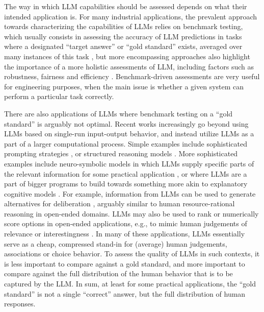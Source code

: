 \documentclass[fleqn]{article}
\begin{document}
The way in which LLM capabilities should be assessed depends on what their intended application is.
For many industrial applications, the prevalent approach towards characterizing the capabilities of LLMs relies on benchmark testing, which usually consists in assessing the accuracy of LLM predictions in tasks where a designated ``target answer'' or ``gold standard'' exists, averaged over many instances of this task \citep[e.g.,][]{srivastava2023-BIGbench}, but more encompassing approaches also highlight the importance of a more holistic assessments of LLM, including factors such as robustness, fairness and efficiency \citep{LiangBommasani2023:Holistic-Evalua}.
Benchmark-driven assessments are very useful for engineering purposes, when the main issue is whether a given system can perform a particular task correctly.




There are also applications of LLMs where benchmark testing on a ``gold standard'' is arguably not optimal.
Recent works increasingly go beyond using LLMs based on single-run input-output behavior, and instead utilize LLMs as a part of a larger computational process.
Simple examples include sophisticated prompting strategies \citep[e.g.,][]{LiuLiu2022:Generated-Knowl}, or structured reasoning models \citep[e.g.,][]{CreswellShanahan2022:Selection-Infer,GaoMadaan2023:PAL:-Program-ai,ParanjapeLundberg2023:ART:-Automatic-}.
More sophisticated examples include neuro-symbolic models in which LLMs supply specific parts of the relevant information for some practical application , or where LLMs are a part of bigger programs to build towards something more akin to explanatory cognitive models \citep[e.g.,][]{WongGrand2023:From-Word-Model}.
For example, information from LLMs can be used to generate alternatives for deliberation \citep[e.g.][]{TsvilodubCarcassi2024:Towards-Neuro-S}, arguably similar to human resource-rational reasoning in open-ended domains. 
LLMs may also be used to rank or numerically score options in open-ended applications, e.g., to mimic human judgements of relevance or interestingness \citep[e.g.,][]{ParkOBrien2023:Generative-Agen,ZhangLehman2023:OMNI:-Open-ende}.
In many of these applications, LLMs essentially serve as a cheap, compressed stand-in for (average) human judgements, associations or choice behavior.
To assess the quality of LLMs in such contexts, it is less important to compare against a gold standard, and more important to compare against the full distribution of the human behavior that is to be captured by the LLM.
In sum, at least for some practical applications, the ``gold standard'' is not a single ``correct'' answer, but the full distribution of human responses.
\end{document}
